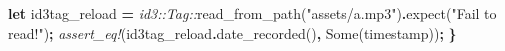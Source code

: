 \documentclass[
]{book}
\newenvironment{Shaded}{\begin{snugshade}}{\end{snugshade}}
\newcommand{\ConstantTok}[1]{\textcolor[rgb]{0.00,0.00,0.00}{#1}}
\newcommand{\KeywordTok}[1]{\textcolor[rgb]{0.13,0.29,0.53}{\textbf{#1}}}
\newcommand{\NormalTok}[1]{#1}
\newcommand{\OperatorTok}[1]{\textcolor[rgb]{0.81,0.36,0.00}{\textbf{#1}}}
\newcommand{\PreprocessorTok}[1]{\textcolor[rgb]{0.56,0.35,0.01}{\textit{#1}}}
\newcommand{\StringTok}[1]{\textcolor[rgb]{0.31,0.60,0.02}{#1}}
\begin{document}
\begin{Shaded}
\begin{Highlighting}[]
    \KeywordTok{let}\NormalTok{ id3tag\_reload }\OperatorTok{=} \PreprocessorTok{id3::Tag::}\NormalTok{read\_from\_path(}\StringTok{"assets/a.mp3"}\NormalTok{)}\OperatorTok{.}\NormalTok{expect(}\StringTok{"Fail to read!"}\NormalTok{)}\OperatorTok{;}
    \PreprocessorTok{assert\_eq!}\NormalTok{(id3tag\_reload}\OperatorTok{.}\NormalTok{date\_recorded()}\OperatorTok{,} \ConstantTok{Some}\NormalTok{(timestamp))}\OperatorTok{;}
\OperatorTok{\}}
\end{Highlighting}
\end{Shaded}


  
\end{document}

